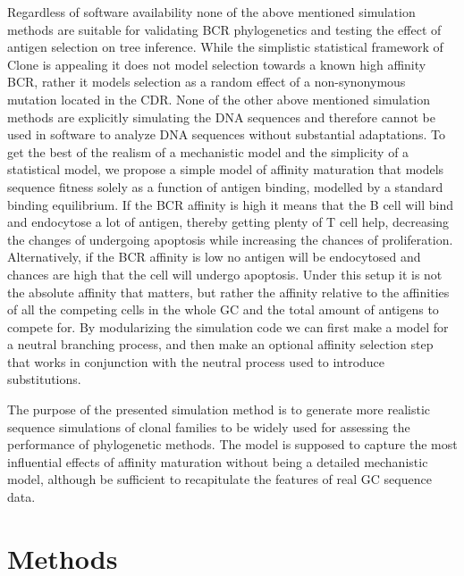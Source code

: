 Regardless of software availability none of the above mentioned simulation methods are suitable for validating BCR phylogenetics and testing the effect of antigen selection on tree inference.
While the simplistic statistical framework of Clone is appealing it does not model selection towards a known high affinity BCR, rather it models selection as a random effect of a non-synonymous mutation located in the CDR.
None of the other above mentioned simulation methods are explicitly simulating the DNA sequences and therefore cannot be used in software to analyze DNA sequences without substantial adaptations.
To get the best of the realism of a mechanistic model and the simplicity of a statistical model, we propose a simple model of affinity maturation that models sequence fitness solely as a function of antigen binding, modelled by a standard binding equilibrium.
If the BCR affinity is high it means that the B cell will bind and endocytose a lot of antigen, thereby getting plenty of T cell help, decreasing the changes of undergoing apoptosis while increasing the chances of proliferation.
Alternatively, if the BCR affinity is low no antigen will be endocytosed and chances are high that the cell will undergo apoptosis.
Under this setup it is not the absolute affinity that matters, but rather the affinity relative to the affinities of all the competing cells in the whole GC and the total amount of antigens to compete for.
By modularizing the simulation code we can first make a model for a neutral branching process, and then make an optional affinity selection step that works in conjunction with the neutral process used to introduce substitutions.

The purpose of the presented simulation method is to generate more realistic sequence simulations of clonal families to be widely used for assessing the performance of phylogenetic methods.
The model is supposed to capture the most influential effects of affinity maturation without being a detailed mechanistic model, although be sufficient to recapitulate the features of real GC sequence data.






\section{Methods}

